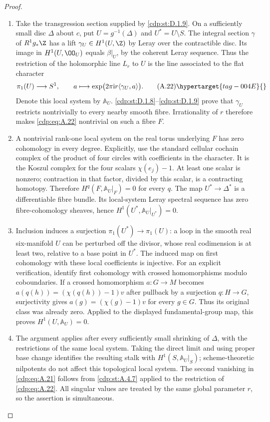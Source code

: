 \begin{proof}

\begin{enumerate}[label=\arabic*.,leftmargin=*]
\item Take the transgression section supplied by \ref{cdp:st:D.1.9}. On a sufficiently small disc $\Delta$ about $c$, put $U=g^{-1}(\Delta)$ and $U^*=U\setminus S$. The integral section $\gamma$ of $R^1g_*\Z$ has a lift $\gamma_U\in H^1(U,\Z)$ by Leray over the contractible disc. Its image in $H^1(U,\OO_U)$ equals $\beta|_U$, by the coherent Leray sequence. Thus the restriction of the holomorphic line $L_r$ to $U$ is the line associated to the flat character
\[
 \pi_1(U)\longrightarrow S^1,\qquad
 a\longmapsto\exp\bigl(2\pi\mathrm i r\langle\gamma_U,a\rangle\bigr).
 \tag{A.22}\hypertarget{tag-004E}{}\label{cdp:eq:A.22}
\]
Denote this local system by $\mathbb A_U$. \ref{cdp:st:D.1.8}--\ref{cdp:st:D.1.9} prove that $\gamma_U$ restricts nontrivially to every nearby smooth fibre. Irrationality of $r$ therefore makes \eqref{cdp:eq:A.22} nontrivial on such a fibre $F$.

\item A nontrivial rank-one local system on the real torus underlying $F$ has zero cohomology in every degree. Explicitly, use the standard cellular cochain complex of the product of four circles with coefficients in the character. It is the Koszul complex for the four scalars $\chi(e_j)-1$. At least one scalar is nonzero; contraction in that factor, divided by this scalar, is a contracting homotopy. Therefore $H^q(F,\mathbb A_U|_F)=0$ for every $q$. The map $U^*\to\Delta^*$ is a differentiable fibre bundle. Its local-system Leray spectral sequence has zero fibre-cohomology sheaves, hence
$H^1(U^*,\mathbb A_U|_{U^*})=0$.

\item Inclusion induces a surjection $\pi_1(U^*)\to\pi_1(U)$: a loop in the smooth real six-manifold $U$ can be perturbed off the divisor, whose real codimension is at least two, relative to a base point in $U^*$. The induced map on first cohomology with these local coefficients is injective. For an explicit verification, identify first cohomology with crossed homomorphisms modulo coboundaries. If a crossed homomorphism $a:G\to M$ becomes $a(q(h))=(\chi(q(h))-1)v$ after pullback by a surjection $q:H\to G$, surjectivity gives $a(g)=(\chi(g)-1)v$ for every $g\in G$. Thus its original class was already zero. Applied to the displayed fundamental-group map, this proves $H^1(U,\mathbb A_U)=0$.

\item The argument applies after every sufficiently small shrinking of $\Delta$, with the restrictions of the same local system. Taking the direct limit and using proper base change identifies the resulting stalk with $H^1(S,\mathbb A_U|_S)$; scheme-theoretic nilpotents do not affect this topological local system. The second vanishing in \eqref{cdp:eq:A.21} follows from \ref{cdp:st:A.4.7} applied to the restriction of \eqref{cdp:eq:A.22}. All singular values are treated by the same global parameter $r$, so the assertion is simultaneous.

\end{enumerate}
\end{proof}
